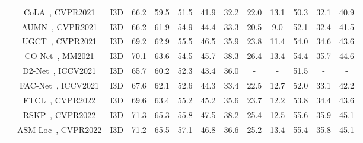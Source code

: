 \begin{table*}[t]
\begin{tabular}{c|c|c|ccccccc|ccc}
& CoLA~\cite{cvpr2021cola}, CVPR2021                         & I3D                      & 66.2          & 59.5          & 51.5          & 41.9          & 32.2          & 22.0          & 13.1          & 50.3          & 32.1          & 40.9          \\
								   & AUMN~\cite{cvpr2021aumn}, CVPR2021                         & I3D                      & 66.2          & 61.9          & 54.9          & 44.4          & 33.3          & 20.5          & 9.0           & 52.1          & 32.4          & 41.5          \\
								   & UGCT~\cite{cvpr2021ugct}, CVPR2021                         & I3D                      & 69.2          & 62.9          & 55.5          & 46.5          & 35.9          & 23.8          & 11.4          & 54.0          & 34.6          & 43.6          \\
								   & CO-Net~\cite{mm2021CO2Net}, MM2021                     & I3D                      & 70.1          & 63.6          & 54.5          & 45.7          & 38.3          & 26.4          & 13.4          & 54.4          & 35.7          & 44.6          \\
								   & D2-Net~\cite{iccv2021d2net}, ICCV2021                      & I3D                      & 65.7          & 60.2          & 52.3          & 43.4          & 36.0          & -             & -             & 51.5          & -             & -             \\
								   & FAC-Net~\cite{iccv2021facnet}, ICCV2021                    & I3D                      & 67.6          & 62.1          & 52.6          & 44.3          & 33.4          & 22.5          & 12.7          & 52.0          & 33.1          & 42.2          \\
                                   & FTCL~\cite{cvpr2022ftcl}, CVPR2022                         & I3D                      & 69.6          & 63.4          & 55.2          & 45.2          & 35.6          & 23.7          & 12.2          & 53.8          & 34.4          & 43.6          \\
                                   & RSKP~\cite{cvpr2022rskp}, CVPR2022                         & I3D                      & 71.3          & 65.3          & 55.8          & 47.5          & 38.2          & 25.4          & 12.5          & 55.6          & 35.9          & 45.1          \\
                                   & ASM-Loc~\cite{cvpr2022asmloc}, CVPR2022                    & I3D                      & 71.2          & 65.5          & 57.1          & 46.8          & 36.6          & 25.2          & 13.4          & 55.4          & 35.8          & 45.1          \\

\end{tabular}
\end{table*}
